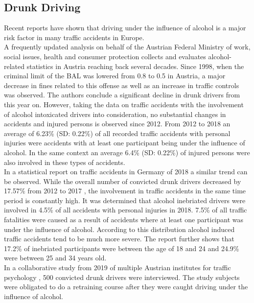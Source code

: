 \subsection{Drunk Driving}
\label{subsection:drunkDriving}
%
Recent reports have shown that driving under the influence of alcohol is a major risk factor in many traffic accidents in Europe. \autocite{fell2014update}
\\
A frequently updated analysis on behalf of the Austrian Federal Ministry of work, social issues, health and consumer protection \autocite[107]{bmasgk2019alkohol} collects and evaluates alcohol-related statistics in Austria reaching back several decades.
Since 1998, when the criminal limit of the BAL was lowered from 0.8 to 0.5 in Austria, a major decrease in fines related to this offense as well as an increase in traffic controls was observed.
The authors conclude a significant decline in drunk drivers from this year on.
However, taking the data on traffic accidents with the involvement of alcohol intoxicated drivers into consideration, no substantial changes in accidents and injured persons is observed since 2012.
From 2012 to 2018 an average of 6.23\% (SD: 0.22\%) of all recorded traffic accidents with personal injuries were accidents with at least one participant being under the influence of alcohol.
In the same context an average 6.4\% (SD: 0.22\%) of injured persons were also involved in these types of accidents. 
\\
In a statistical report on traffic accidents in Germany of 2018 \autocite[]{destatis2019alkohol} a similar trend can be observed.
While the overall number of convicted drunk drivers decreased by 17.57\% from 2012 to 2017 \autocite[51]{destatis2019alkohol}, the involvement in traffic accidents in the same time period is constantly high.
It was determined that alcohol inebriated drivers were involved in 4.5\% of all accidents with personal injuries in 2018. 
7.5\% of all traffic fatalities were caused as a result of accidents where at least one participant was under the influence of alcohol.
According to this distribution alcohol induced traffic accidents tend to be much more severe.
The report further shows that 17.2\% of inebriated participants were between the age of 18 and 24 and 24.9\% were between 25 and 34 years old.
\\
In a collaborative study from 2019 of multiple Austrian institutes for traffic psychology \autocite[]{bartl2019alkohol}, 500 convicted drunk drivers were interviewed.
The study subjects were obligated to do a retraining course after they were caught driving under the influence of alcohol. 
